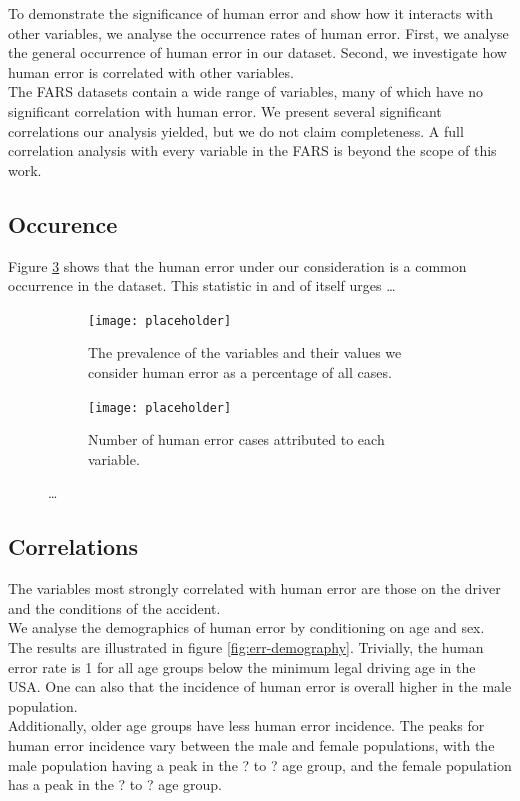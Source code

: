 \documentclass{article}
\theoremstyle{plain}
\theoremstyle{definition}
\theoremstyle{remark}
\begin{document}

To demonstrate the significance of human error and show how it interacts with other variables, we analyse the occurrence rates of human error. First, we analyse the general occurrence of human error in our dataset. Second, we investigate how human error is correlated with other variables.
\\
The FARS datasets contain a wide range of variables, many of which have no significant correlation with human error. We present several significant correlations our analysis yielded, but we do not claim completeness. A full correlation analysis with every variable in the FARS is beyond the scope of this work.

\subsection{Occurence}
Figure \ref{fig:occurence} shows that the human error under our consideration is a common occurrence in the dataset. This statistic in and of itself urges \ldots

\begin{figure}[ht]
	\vskip 0.2in
	\centering
		\begin{subfigure}[ht]{0.45\columnwidth}
			\texttt{[image: placeholder]}
			\caption{The prevalence of the variables and their values we consider human error as a percentage of all cases.}
			\label{prevalence-per-variable}
		\end{subfigure}
		\hfill
		\begin{subfigure}[ht]{0.45\columnwidth}
			\texttt{[image: placeholder]}
			\caption{Number of human error cases attributed to each variable.}
			\label{prevalence-multiple-occurence}
		\end{subfigure}
	\caption{\ldots}
	\label{fig:occurence}
	\vskip 0.2in
\end{figure}

\subsection{Correlations}
The variables most strongly correlated with human error are those on the driver and the conditions of the accident.
\\
We analyse the demographics of human error by conditioning on age and sex. The results are illustrated in figure \ref{fig:err-demography}. Trivially, the human error rate is 1 for all age groups below the minimum legal driving age in the USA. One can also that the incidence of human error is overall higher in the male population.\\
Additionally, older age groups have less human error incidence. The peaks for human error incidence vary between the male and female populations, with the male population having a peak in the ? to ? age group, and the female population has a peak in the ? to ? age group.\\
\end{document}
